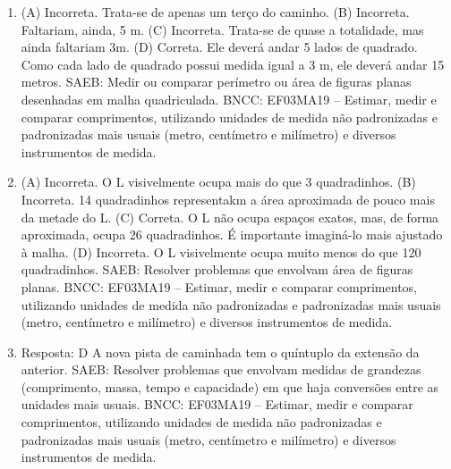 \begin{enumerate}
\item
(A) Incorreta. Trata-se de apenas um terço do caminho.
(B) Incorreta. Faltariam, ainda, 5 m.
(C) Incorreta. Trata-se de quase a totalidade, mas ainda faltariam 3m.
(D) Correta. Ele deverá andar 5 lados de quadrado. Como cada lado de quadrado possui
medida igual a 3 m, ele deverá andar 15 metros.
SAEB: Medir ou comparar perímetro ou área de figuras planas desenhadas em malha quadriculada. 
BNCC: EF03MA19 -- Estimar, medir e comparar comprimentos, utilizando unidades de medida
não padronizadas e padronizadas mais usuais (metro, centímetro e milímetro) e diversos
instrumentos de medida.

\item
(A) Incorreta. O L visivelmente ocupa mais do que 3 quadradinhos.
(B) Incorreta. 14 quadradinhos representakm a área aproximada de pouco mais da metade do L.
(C) Correta. O L não ocupa espaços exatos, mas, de forma aproximada, ocupa 26 quadradinhos. É importante imaginá-lo mais ajustado à malha.
(D) Incorreta. O L visivelmente ocupa muito menos do que 120 quadradinhos.
SAEB: Resolver problemas que envolvam área de figuras planas. 
BNCC: EF03MA19 -- Estimar, medir e comparar comprimentos, utilizando unidades de medida
não padronizadas e padronizadas mais usuais (metro, centímetro e milímetro) e diversos
instrumentos de medida.

\item
Resposta: D
A nova pista de caminhada tem o quíntuplo da extensão da anterior.
SAEB: Resolver problemas que envolvam medidas de grandezas (comprimento, massa, tempo e capacidade) em que haja conversões entre as unidades mais usuais. 
BNCC: EF03MA19 -- Estimar, medir e comparar comprimentos, utilizando unidades de medida
não padronizadas e padronizadas mais usuais (metro, centímetro e milímetro) e diversos
instrumentos de medida.
\end{enumerate}


